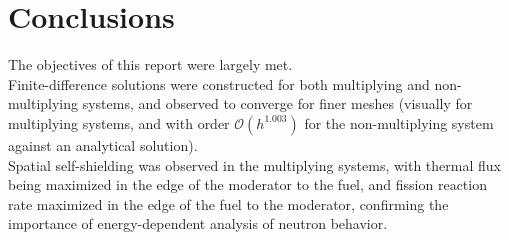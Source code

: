 \documentclass[11pt]{article} %
\newcommand{\bigO}{\mathcal{O}}
\begin{document}
\section{Conclusions}
The objectives of this report were largely met.\\

Finite-difference solutions were constructed for both multiplying and non-multiplying systems, and observed to converge for finer meshes (visually for multiplying systems, and with order $\bigO(h^{1.003})$ for the non-multiplying system against an analytical solution).\\

Spatial self-shielding was observed in the multiplying systems, with thermal flux being maximized in the edge of the moderator to the fuel, and fission reaction rate maximized in the edge of the fuel to the moderator, confirming the importance of energy-dependent analysis of neutron behavior.

\end{document}
